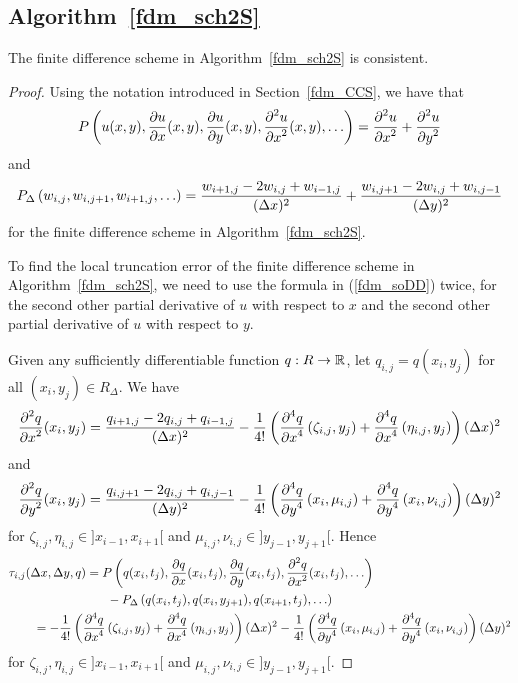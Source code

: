 \subsection{Algorithm~\ref{fdm_sch2S}} 

\begin{prop}\label{fdm_sch2S_const}
The finite difference scheme in Algorithm~\ref{fdm_sch2S} is consistent.
\end{prop}

\begin{proof}
Using the notation introduced in Section~\ref{fdm_CCS}, we have that
\[
P\left(u(x,y), \frac{\partial{u}}{\partial{x}}(x,y), \frac{\partial{u}}{\partial{y}}(x,y),
  \frac{\displaystyle \partial^{2}{u}} {\displaystyle \partial{x}^{2}}(x,y), \ldots \right)
= \frac{\displaystyle \partial^{2}{u}} {\displaystyle \partial{x}^{2}} + \frac{\displaystyle \partial^{2}{u}} {\displaystyle \partial{y}^{2}}
\]
and
\[
P_\Delta\left(w_{i,j}, w_{i,j+1}, w_{i+1,j}, \ldots\right)
= \frac{w_{i+1,j} - 2w_{i,j} + w_{i-1,j}}{(\Delta{x})^2}
+ \frac{w_{i,j+1} - 2w_{i,j} + w_{i,j-1}}{(\Delta{y})^2}
\]
for the finite difference scheme in Algorithm~\ref{fdm_sch2S}.

To find the local truncation error of the finite difference scheme in
Algorithm~\ref{fdm_sch2S}, we need to use the formula in
(\ref{fdm_soDD}) twice, for the second other partial derivative of $u$
with respect to $x$ and the second other partial derivative of $u$
with respect to $y$.

Given any sufficiently differentiable function
$q:R \to \mathbb{R}$, let $q_{i,j}= q(x_i,y_j)$ for all $(x_i,y_j) \in R_\Delta$. 
We have
\[
\frac{\displaystyle \partial^{2}{q}} {\displaystyle \partial{x}^{2}}(x_i,y_j) =
\frac{q_{i+1,j} - 2q_{i,j} + q_{i-1,j}}{(\Delta{x})^2}
- \frac{1}{4!} \left( \frac{\displaystyle \partial^{4}{q}} {\displaystyle \partial{x}^{4}}\left(\zeta_{i,j},y_j\right)
  + \frac{\displaystyle \partial^{4}{q}} {\displaystyle \partial{x}^{4}}\left(\eta_{i,j},y_j\right) \right) (\Delta{x})^2
\]
and
\[
\frac{\displaystyle \partial^{2}{q}} {\displaystyle \partial{y}^{2}}(x_i,y_j) =
\frac{q_{i,j+1} - 2q_{i,j} + q_{i,j-1}}{(\Delta{y})^2}
- \frac{1}{4!} \left( \frac{\displaystyle \partial^{4}{q}} {\displaystyle \partial{y}^{4}}\left(x_i,\mu_{i,j} \right)
+ \frac{\displaystyle \partial^{4}{q}} {\displaystyle \partial{y}^{4}}\left(x_i,\nu_{i,j} \right) \right) (\Delta{y})^2
\]
for $\zeta_{i,j}, \eta_{i,j} \in ]x_{i-1},x_{i+1}[$ and
$\mu_{i,j}, \nu_{i,j} \in ]y_{j-1},y_{j+1}[$.  Hence
\begin{align*}
&\tau_{i,j}(\Delta{x},\Delta{y},q)
= P\left(q(x_i,t_j), \frac{\partial{q}}{\partial{x}}(x_i,t_j), \frac{\partial{q}}{\partial{y}}(x_i,t_j),
  \frac{\displaystyle \partial^{2}{q}} {\displaystyle \partial{x}^{2}}(x_i,t_j), \ldots \right) \\
&\qquad\qquad\qquad\qquad
- P_\Delta\left(q(x_i,t_j), q(x_i,y_{j+1}), q(x_{i+1},t_j), \ldots\right) \\
&\qquad
= - \frac{1}{4!} \left( \frac{\displaystyle \partial^{4}{q}} {\displaystyle \partial{x}^{4}}\left(\zeta_{i,j},y_j\right)
+ \frac{\displaystyle \partial^{4}{q}} {\displaystyle \partial{x}^{4}}\left(\eta_{i,j},y_j\right) \right) (\Delta{x})^2
- \frac{1}{4!} \left( \frac{\displaystyle \partial^{4}{q}} {\displaystyle \partial{y}^{4}}\left(x_i,\mu_{i,j} \right)
+ \frac{\displaystyle \partial^{4}{q}} {\displaystyle \partial{y}^{4}}\left(x_i,\nu_{i,j} \right) \right) (\Delta{y})^2
\end{align*}
for $\zeta_{i,j}, \eta_{i,j} \in ]x_{i-1},x_{i+1}[$ and
$\mu_{i,j}, \nu_{i,j} \in ]y_{j-1},y_{j+1}[$.


\end{proof}
